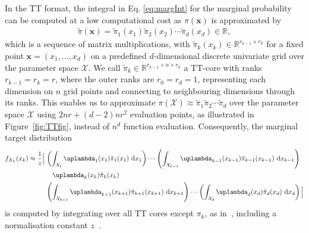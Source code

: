 In the TT format, the integral in Eq. \ref{eq:margInt} for the marginal probability can be computed at a low computational cost as $\pi(\bm{x})$ is approximated by
\begin{align*}
	\tilde{\pi}(\bm{x}) = 	\tilde{\pi}_1(x_1)  \tilde{\pi}_2(x_2)  \cdots \tilde{\pi}_d(x_d)  \in \mathbb{R},
\end{align*}
which is a sequence of matrix multiplications, with $\tilde{\pi}_k(x_k) \in \mathbb{R}^{r_{k-1} \times r_k}$ for a fixed point $\bm{x} = (x_1, \dots, x_d)$ on a predefined $d$-dimensional discrete univariate grid over the parameter space $\mathcal{X}$. 
We call $\tilde{\pi}_k \in \mathbb{R}^{r_{k-1} \times n \times r_k}$ a TT-core with ranks $ r_{k-1} = r_k= r$, where the outer ranks are $r_0 = r_d = 1$, representing each dimension on $n$ grid points and connecting to neighbouring dimensions through its ranks.
This enables us to approximate $\pi(\mathcal{X})\approx \tilde{\pi}_1  \tilde{\pi}_2  \cdots \tilde{\pi}_d$ over the parameter space $\mathcal{X}$ using $2nr + (d-2)nr^2$ evaluation points, as illustrated in Figure~\ref{fig:TTfig}, instead of $n^d$ function evaluation.
Consequently, the marginal target distribution
\begin{align}
	\begin{split}
		f_{X_k}(x_k) \approx \frac{1}{z} \Big|\, 
		&\left( \int_{\mathcal{X}_1} \uplambda_1(x_1) \tilde{\pi}_1(x_1) \, \diff x_1 \right) \cdots 
		\left( \int_{\mathcal{X}_{k-1}} \uplambda_{k-1}(x_{k-1}) \tilde{\pi}_{k-1}(x_{k-1}) \, \diff x_{k-1} \right) \\
		&\quad \uplambda_k(x_k) \tilde{\pi}_k(x_k) \\
		& \left( \int_{\mathcal{X}_{k+1}} \uplambda_{k+1}(x_{k+1}) \tilde{\pi}_{k+1}(x_{k+1}) \,\diff x_{k+1} \right) \cdots 
		\left( \int_{\mathcal{X}_{d}} \uplambda_d(x_d) \tilde{\pi}_d(x_d) \, \diff x_d \right)
		\Big| 
	\end{split}
\end{align}
is computed by integrating over all TT cores except $\pi_k$, as in~\cite{dolgov2020approximation}, including a normalisation constant $z$~\cite{cui2022deep}.

